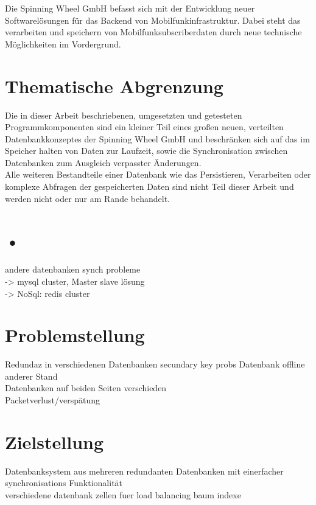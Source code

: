 \documentclass[a4paper,11pt,oneside,%
headsepline,												%
footsepline,												%
bibtotocnumbered									%
]{scrreprt}
\begin{document}
Die Spinning Wheel GmbH befasst sich mit der Entwicklung neuer Softwarelösungen für das Backend von Mobilfunkinfrastruktur. Dabei steht das verarbeiten und speichern von Mobilfunksubscriberdaten durch neue technische Möglichkeiten im Vordergrund.

\section{Thematische Abgrenzung}
Die in dieser Arbeit beschriebenen, umgesetzten und getesteten Programmkomponenten sind ein kleiner Teil eines großen neuen, verteilten Datenbankkonzeptes der Spinning Wheel GmbH und beschränken sich auf das im Speicher halten von Daten zur Laufzeit, sowie die Synchronisation zwischen Datenbanken zum Ausgleich verpasster Änderungen.\\

Alle weiteren Bestandteile einer Datenbank wie das Persistieren, Verarbeiten oder komplexe Abfragen der gespeicherten Daten sind nicht Teil dieser Arbeit und werden nicht oder nur am Rande behandelt.  

\section{•}
andere datenbanken synch probleme\\
-> mysql cluster, Master slave lösung\\
-> NoSql: redis cluster\\



\section{Problemstellung}
Redundaz in verschiedenen Datenbanken
secundary key probs
Datenbank offline anderer Stand \\
Datenbanken auf beiden Seiten verschieden\\
Packetverlust/verspätung


\section{Zielstellung}
Datenbanksystem aus mehreren redundanten Datenbanken mit einerfacher synchronisations Funktionalität\\

verschiedene datenbank zellen fuer load balancing
baum indexe\\
\end{document}
